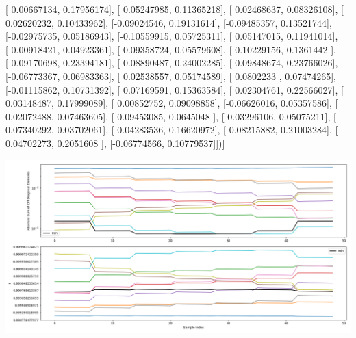 \documentclass{article}
\begin{document}
       [ 0.00667134,  0.17956174],
       [ 0.05247985,  0.11365218],
       [ 0.02468637,  0.08326108],
       [ 0.02620232,  0.10433962],
       [-0.09024546,  0.19131614],
       [-0.09485357,  0.13521744],
       [-0.02975735,  0.05186943],
       [-0.10559915,  0.05725311],
       [ 0.05147015,  0.11941014],
       [-0.00918421,  0.04923361],
       [ 0.09358724,  0.05579608],
       [ 0.10229156,  0.1361442 ],
       [-0.09170698,  0.23394181],
       [ 0.08890487,  0.24002285],
       [ 0.09848674,  0.23766026],
       [-0.06773367,  0.06983363],
       [ 0.02538557,  0.05174589],
       [ 0.0802233 ,  0.07474265],
       [-0.01115862,  0.10731392],
       [ 0.07169591,  0.15363584],
       [ 0.02304761,  0.22566027],
       [ 0.03148487,  0.17999089],
       [ 0.00852752,  0.09098858],
       [-0.06626016,  0.05357586],
       [ 0.02072488,  0.07463605],
       [-0.09453085,  0.0645048 ],
       [ 0.03296106,  0.05075211],
       [ 0.07340292,  0.03702061],
       [-0.04283536,  0.16620972],
       [-0.08215882,  0.21003284],
       [ 0.04702273,  0.2051608 ],
       [-0.06774566,  0.10779537]])]
\begin{center}
\includegraphics[scale=.9]{report_pickled_controls119/control_dpn_all.png}

\end{center}
\end{document}
